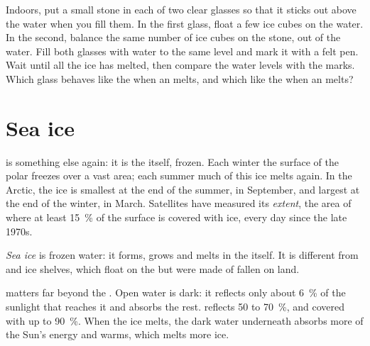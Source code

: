 \begin{inthelab}
Indoors, put a small stone in each of two clear glasses so that it sticks
out above the water when you fill them. In the first glass, float a few
ice cubes on the water. In the second, balance the same number of ice
cubes on the stone, out of the water. Fill both glasses with water to the
same level and mark it with a felt pen. Wait until all the ice has
melted, then compare the water levels with the marks. Which glass
behaves like the  when an  melts, and which like the  when an
 melts?
\end{inthelab}

\section{Sea ice}

 is something else again: it is the  itself, frozen. Each
winter the surface of the polar  freezes over a vast area; each
summer much of this ice melts again. In the Arctic, the ice is smallest
at the end of the summer, in September, and largest at the end of the
winter, in March. Satellites have measured its \emph{extent}, the area of
 where at least 15~\% of the surface is covered with ice, every day
since the late 1970s.

\begin{definition}\label{def:g8:ice-on-earth:sea-ice}
\emph{Sea ice} is frozen  water: it forms, grows and melts in the
 itself. It is different from  and ice shelves, which float
on the  but were made of  fallen on land.
\end{definition}

 matters far beyond the . Open  water is dark: it reflects
only about 6~\% of the sunlight that reaches it and absorbs the rest.  reflects 50 to 70~\%, and  covered with  up to 90~\%. When
the ice melts, the dark water underneath absorbs more of the Sun's energy
and warms, which melts more ice.

